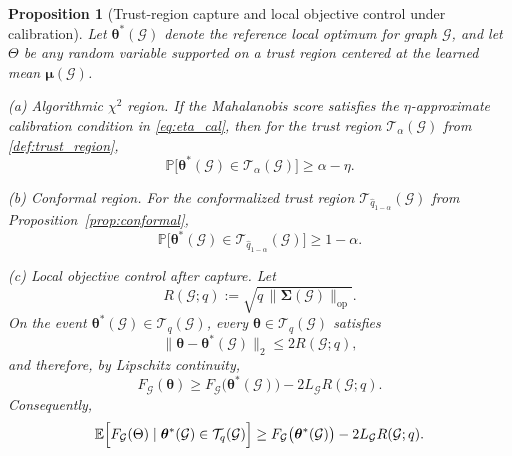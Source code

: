 \documentclass[aps,prx,reprint,superscriptaddress,longbibliography]{revtex4-2}
\newcommand{\calG}{\mathcal{G}}
\newcommand{\calT}{\mathcal{T}}
\newcommand{\bbE}{\mathbb{E}}
\newcommand{\bbP}{\mathbb{P}}
\newtheorem{proposition}[theorem]{Proposition}
\begin{document}
\begin{proposition}[Trust-region capture and local objective control under calibration]
\label{prop:trust_region_adequacy}
Let $\bm\theta^*(\calG)$ denote the reference local optimum for graph
$\calG$, and let $\Theta$ be any random variable supported on a trust
region centered at the learned mean $\bm\mu(\calG)$.

\emph{(a) Algorithmic $\chi^2$ region.}
If the Mahalanobis score satisfies the $\eta$-approximate calibration
condition in \cref{eq:eta_cal}, then for the trust region
$\calT_\alpha(\calG)$ from \cref{def:trust_region},
\begin{equation}
    \bbP\bigl[\bm\theta^*(\calG) \in \calT_\alpha(\calG)\bigr]
    \ge \alpha - \eta.
    \label{eq:trust_capture_chi2}
\end{equation}

\emph{(b) Conformal region.}
For the conformalized trust region $\calT_{\hat q_{1-\alpha}}(\calG)$ from
Proposition~\ref{prop:conformal},
\begin{equation}
    \bbP\bigl[\bm\theta^*(\calG) \in \calT_{\hat q_{1-\alpha}}(\calG)\bigr]
    \ge 1-\alpha.
    \label{eq:trust_capture_conformal}
\end{equation}

\emph{(c) Local objective control after capture.}
Let
\begin{equation}
    R(\calG;q) := \sqrt{q\,\|\bm\Sigma(\calG)\|_{\mathrm{op}}}.
    \label{eq:trust_radius_generic}
\end{equation}
On the event $\bm\theta^*(\calG) \in \calT_q(\calG)$, every
$\bm\theta \in \calT_q(\calG)$ satisfies
\begin{equation}
    \|\bm\theta - \bm\theta^*(\calG)\|_2 \le 2R(\calG;q),
    \label{eq:trust_two_radius}
\end{equation}
and therefore, by Lipschitz continuity,
\begin{equation}
    F_\calG(\bm\theta)
    \ge F_\calG\bigl(\bm\theta^*(\calG)\bigr)
    - 2L_\calG R(\calG;q).
    \label{eq:trust_target_gap}
\end{equation}
Consequently,
\begin{equation}
    \bbE\Bigl[F_\calG(\Theta)
    \mid \bm\theta^*(\calG) \in \calT_q(\calG)\Bigr]
    \ge F_\calG\bigl(\bm\theta^*(\calG)\bigr)
    - 2L_\calG R(\calG;q).
    \label{eq:trust_target_gap_exp}
\end{equation}
\end{proposition}
\end{document}
